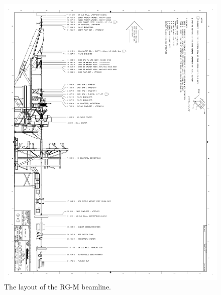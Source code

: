 \documentclass[12pt]{article}
\begin{document}
\begin{figure}[hbt]
\vspace{-2cm}
\begin{center}
\includegraphics[width=6in]{rgm_beam_page1.pdf}
\caption{ \label{fig:beamline1} The layout of the RG-M beamline. }
\end{center}
\end{figure}
\end{document}
